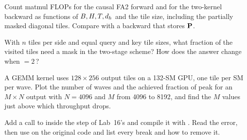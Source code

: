 \begin{exercise}
Count matmul FLOPs for the causal FA2 forward and for the two-kernel backward as functions of
$B,H,T,d_{h}$ and the tile size, including the partially masked diagonal tiles. Compare with a
backward that stores $\mathbf{P}$.
\end{exercise}

\begin{exercise}
With $n$ tiles per side and equal query and key tile sizes, what fraction of the visited tiles need a
mask in the two-stage scheme? How does the answer change when $=2\,$?
\end{exercise}

\begin{exercise}\label{ex:perf:waves}
A GEMM kernel uses $128\times256$ output tiles on a 132-SM GPU, one tile per SM per wave. Plot the
number of waves and the achieved fraction of peak for an $M\times N$ output with $N=4096$ and
$M$ from 4096 to 8192, and find the $M$ values just above which throughput drops.
\end{exercise}

\begin{exercise}
Add a call to  inside the step of Lab~16's  and
compile it with . Read the error, then use  on the
original code and list every break and how to remove it.
\end{exercise}


